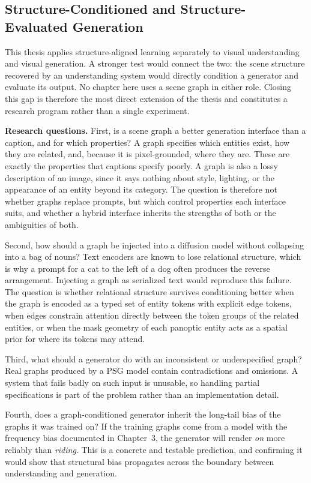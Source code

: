 \subsection{Structure-Conditioned and Structure-Evaluated Generation}
\label{sec:future_structure_conditioned}
This thesis applies structure-aligned learning separately to visual understanding and visual generation. A stronger test would connect the two: the scene structure recovered by an understanding system would directly condition a generator and evaluate its output. No chapter here uses a scene graph in either role. Closing this gap is therefore the most direct extension of the thesis and constitutes a research program rather than a single experiment.

\noindent \textbf{Research questions.}
First, is a scene graph a better generation interface than a caption, and for which properties? A graph specifies which entities exist, how they are related, and, because it is pixel-grounded, where they are. These are exactly the properties that captions specify poorly. A graph is also a lossy description of an image, since it says nothing about style, lighting, or the appearance of an entity beyond its category. The question is therefore not whether graphs replace prompts, but which control properties each interface suits, and whether a hybrid interface inherits the strengths of both or the ambiguities of both.

Second, how should a graph be injected into a diffusion model without collapsing into a bag of nouns? Text encoders are known to lose relational structure, which is why a prompt for a cat to the left of a dog often produces the reverse arrangement. Injecting a graph as serialized text would reproduce this failure. The question is whether relational structure survives conditioning better when the graph is encoded as a typed set of entity tokens with explicit edge tokens, when edges constrain attention directly between the token groups of the related entities, or when the mask geometry of each panoptic entity acts as a spatial prior for where its tokens may attend.

Third, what should a generator do with an inconsistent or underspecified graph? Real graphs produced by a PSG model contain contradictions and omissions. A system that fails badly on such input is unusable, so handling partial specifications is part of the problem rather than an implementation detail.

Fourth, does a graph-conditioned generator inherit the long-tail bias of the graphs it was trained on? If the training graphs come from a model with the frequency bias documented in Chapter~3, the generator will render \textit{on} more reliably than \textit{riding}. This is a concrete and testable prediction, and confirming it would show that structural bias propagates across the boundary between understanding and generation.

